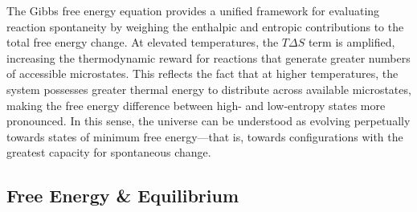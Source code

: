 \documentclass[10pt]{article}
\begin{document}
    The Gibbs free energy equation provides a unified framework for evaluating reaction spontaneity by weighing the enthalpic and entropic contributions to the total free energy change. At elevated temperatures, the $T\Delta S$ term is amplified, increasing the thermodynamic reward for reactions that generate greater numbers of accessible microstates. This reflects the fact that at higher temperatures, the system possesses greater thermal energy to distribute across available microstates, making the free energy difference between high- and low-entropy states more pronounced. In this sense, the universe can be understood as evolving perpetually towards states of minimum free energy---that is, towards configurations with the greatest capacity for spontaneous change.

  \subsection{Free Energy \& Equilibrium}
\end{document}
